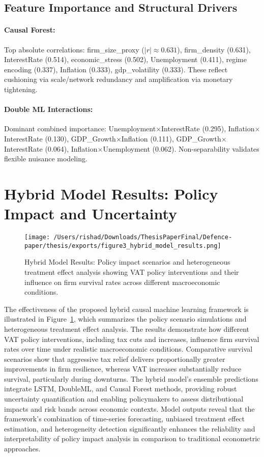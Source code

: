 \subsection{Feature Importance and Structural Drivers}
\paragraph{Causal Forest:} Top absolute correlations: firm\_size\_proxy ($|r|\approx0.631$), firm\_density (0.631), InterestRate (0.514), economic\_stress (0.502), Unemployment (0.411), regime encoding (0.337), Inflation (0.333), gdp\_volatility (0.333). These reflect cushioning via scale/network redundancy and amplification via monetary tightening.

\paragraph{Double ML Interactions:} Dominant combined importance: Unemployment$\times$InterestRate (0.295), Inflation$\times$InterestRate (0.130), GDP\_Growth$\times$Inflation (0.111), GDP\_Growth$\times$InterestRate (0.064), Inflation$\times$Unemployment (0.062). Non-separability validates flexible nuisance modeling.

\section{Hybrid Model Results: Policy Impact and Uncertainty}


\begin{figure}[htbp]
\centering
\texttt{[image: /Users/rishad/Downloads/ThesisPaperFinal/Defence-paper/thesis/exports/figure3\_hybrid\_model\_results.png]}
\caption{Hybrid Model Results: Policy impact scenarios and heterogeneous treatment effect analysis showing VAT policy interventions and their influence on firm survival rates across different macroeconomic conditions.}
\label{fig:hybrid_model_results}
\end{figure}

The effectiveness of the proposed hybrid causal machine learning framework is illustrated in Figure~\ref{fig:hybrid_model_results}, which summarizes the policy scenario simulations and heterogeneous treatment effect analysis. The results demonstrate how different VAT policy interventions, including tax cuts and increases, influence firm survival rates over time under realistic macroeconomic conditions. Comparative survival scenarios show that aggressive tax relief delivers proportionally greater improvements in firm resilience, whereas VAT increases substantially reduce survival, particularly during downturns. The hybrid model's ensemble predictions integrate LSTM, DoubleML, and Causal Forest methods, providing robust uncertainty quantification and enabling policymakers to assess distributional impacts and risk bands across economic contexts. Model outputs reveal that the framework's combination of time-series forecasting, unbiased treatment effect estimation, and heterogeneity detection significantly enhances the reliability and interpretability of policy impact analysis in comparison to traditional econometric approaches.



